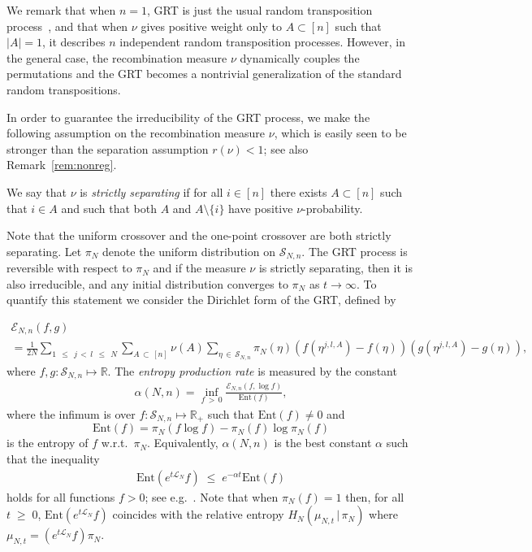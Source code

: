 \documentclass[AHL,Unicode,longabstracts,published]{cedram}
\renewcommand{\leq}{\;\leqslant\;}
\renewcommand{\geq}{\;\geqslant\;}
\newcommand{\tc}{\, |\, }
\newcommand{\ent}{\mathrm{Ent}}
\newcommand{\cE}{\mathcal{E}}
\newcommand{\cL}{\mathcal{L}}
\newcommand{\cS}{\mathcal{S}}
\newcommand{\bbR}{\mathbb{R}}
\let\a=\alpha
\begin{document}
We remark that when $n=1$, GRT is just the usual random transposition process~\cite{DiacShash}, and that when $\nu$ gives positive weight only to $A\subset [n]$ such that $|A|=1$, it describes $n$ independent random transposition processes. However, in the general case, the recombination measure $\nu$ dynamically couples the permutations and the GRT becomes a nontrivial generalization of the standard random transpositions.


In order to guarantee the irreducibility of the GRT process, we make the following assumption on the recombination measure $\nu$, which is easily seen to be stronger than the separation assumption $r(\nu)<1$; see also Remark~\ref{rem:nonreg}.

\begin{defi}\label{def:strict}
We say that $\nu$ is \emph{strictly separating} if for all $i\in[n]$ there exists $A\subset [n]$ such that $i\in A$ and such that both $A$ and $A\setminus\{i\}$ have positive $\nu$-probability.
\end{defi}

Note that the uniform crossover and the one-point crossover are both strictly separating. Let $\pi_N$ denote the uniform distribution on $\cS_{N,n}$. The GRT process is reversible with respect to $\pi_N$ and if the measure $\nu$ is strictly separating, then it is also irreducible, and any initial distribution converges to $\pi_N$ as $t\to\infty$. To quantify this statement we consider the Dirichlet form of the GRT, defined by

\begin{multline}\label{operatorG}
\cE_{N,n}(f,g)\\
=\frac{1}{2N}\sum_{1\,\leq\,j\,<\,l\,\leq\,N}\sum_{A\,\subset\,[n]}\nu(A)
\sum_{\eta\,\in\,\cS_{N,n}}\pi_N(\eta)\left(f\left(\eta^{j,l,A}\right)-f(\eta)\right)\left(g\left(\eta^{j,l,A}\right)-g(\eta)\right),
\end{multline}
where $f,g:\cS_{N,n} \mapsto\bbR$. The \emph{entropy production rate} is measured by the constant
\begin{align}\label{deltaoperatorG}
\a(N,n) = \inf_{f\,>\,0} \frac{\cE_{N,n}(f,\log f)}{\ent(f)},
\end{align}
where the infimum is over $f:\cS_{N,n} \mapsto\bbR_+$ such that $\ent(f)\neq 0$ and
\[
\ent(f) = \pi_N(f\log f)-\pi_N(f)\log\pi_N(f)
\]
is the entropy of $f$ w.r.t.\ $\pi_N$.
Equivalently, $\a(N,n)$ is the best constant $\a$ such that the inequality
\begin{align}\label{gapoperatorG}
\ent\left(e^{t\cL_N}f\right)\leq e^{-\a t}\ent(f)
\end{align}
holds for all functions $f>0$; see e.g.~\cite{BT,DS}. Note that when $\pi_N(f)=1$ then, for all $t\geq 0$, $\ent(e^{t\cL_N}f)$ coincides with the relative entropy $H_N(\mu_{N,t}\tc\pi_N)$ where $\mu_{N,t} =(e^{t\cL_N}f)\pi_N$.
\end{document}
